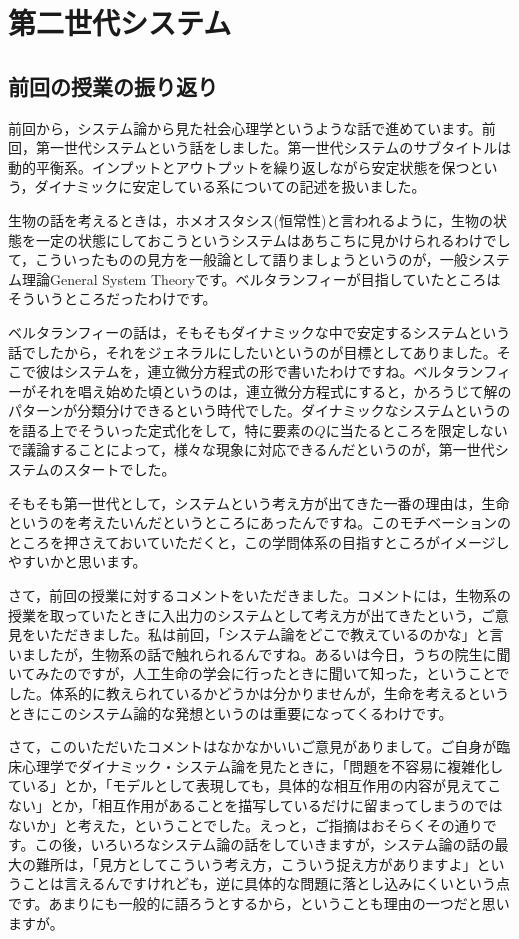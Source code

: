\documentclass{ltjsbook}
\begin{document}
\section{第二世代システム}

\subsection{前回の授業の振り返り}

前回から，システム論から見た社会心理学というような話で進めています。前回，第一世代システムという話をしました。第一世代システムのサブタイトルは動的平衡系。インプットとアウトプットを繰り返しながら安定状態を保つという，ダイナミックに安定している系についての記述を扱いました。

生物の話を考えるときは，ホメオスタシス(恒常性)と言われるように，生物の状態を一定の状態にしておこうというシステムはあちこちに見かけられるわけでして，こういったものの見方を一般論として語りましょうというのが，一般システム理論General System Theoryです。ベルタランフィーが目指していたところはそういうところだったわけです。

ベルタランフィーの話は，そもそもダイナミックな中で安定するシステムという話でしたから，それをジェネラルにしたいというのが目標としてありました。そこで彼はシステムを，連立微分方程式の形で書いたわけですね。ベルタランフィーがそれを唱え始めた頃というのは，連立微分方程式にすると，かろうじて解のパターンが分類分けできるという時代でした。ダイナミックなシステムというのを語る上でそういった定式化をして，特に要素の$Q$に当たるところを限定しないで議論することによって，様々な現象に対応できるんだというのが，第一世代システムのスタートでした。

そもそも第一世代として，システムという考え方が出てきた一番の理由は，生命というのを考えたいんだというところにあったんですね。このモチベーションのところを押さえておいていただくと，この学問体系の目指すところがイメージしやすいかと思います。


さて，前回の授業に対するコメントをいただきました。コメントには，生物系の授業を取っていたときに入出力のシステムとして考え方が出てきたという，ご意見をいただきました。私は前回，「システム論をどこで教えているのかな」と言いましたが，生物系の話で触れられるんですね。あるいは今日，うちの院生に聞いてみたのですが，人工生命の学会に行ったときに聞いて知った，ということでした。体系的に教えられているかどうかは分かりませんが，生命を考えるというときにこのシステム論的な発想というのは重要になってくるわけです。

さて，このいただいたコメントはなかなかいいご意見がありまして。ご自身が臨床心理学でダイナミック・システム論を見たときに，「問題を不容易に複雑化している」とか，「モデルとして表現しても，具体的な相互作用の内容が見えてこない」とか，「相互作用があることを描写しているだけに留まってしまうのではないか」と考えた，ということでした。えっと，ご指摘はおそらくその通りです。この後，いろいろなシステム論の話をしていきますが，システム論の話の最大の難所は，「見方としてこういう考え方，こういう捉え方がありますよ」ということは言えるんですけれども，逆に具体的な問題に落とし込みにくいという点です。あまりにも一般的に語ろうとするから，ということも理由の一つだと思いますが。
\end{document}
